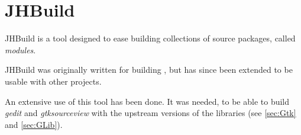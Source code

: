 
\section[JHBuild]{JHBuild\cite{website:jhbuild}}\label{sec:jhbuild}

JHBuild is a tool designed to ease building collections of source packages, called \emph{modules}.

JHBuild was originally written for building \GNOME, but has since been extended to be usable with other projects.

An extensive use of this tool has been done. It was needed, to be able to build \emph{gedit} and \emph{gtksourceview} with the upstream versions of the libraries (see \ref{sec:Gtk} and \ref{sec:GLib}).
